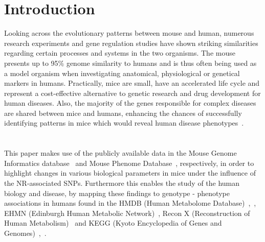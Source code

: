 \documentclass[fleqn,11pt]{SelfArx}
\affiliation{\textsuperscript{1}\textit{Institute of Bioinformatics and Systems Biology, Helmholtz Zentrum MŸnchen, German Research Center for Environmental Health,}} %
\begin{document}
\flushbottom %
\maketitle %
\thispagestyle{empty} %


\section*{Introduction} %

Looking across the evolutionary patterns between mouse and human, numerous research experiments and gene regulation studies have shown striking similarities regarding certain processes and systems in the two organisms. The mouse presents up to 95\% genome similarity to humans and is thus often being used as a model organism when investigating anatomical, physiological or genetical markers in humans. Practically, mice are small, have an accelerated life cycle and represent a cost-effective alternative to genetic research and drug development for human diseases. Also, the majority of the genes responsible for complex diseases are shared between mice and humans, enhancing the chances of successfully identifying patterns in mice which would reveal human disease phenotypes~\cite{intro1}.
~~~~~~~\\
~~~~~~~\\  
This paper makes use of the publicly available data in the Mouse Genome Informatics database~\cite{mgi} and Mouse Phenome Database~\cite{mpd}, respectively, in order to highlight changes in various biological parameters in mice under the influence of the NR-associated SNPs. Furthermore this enables the study of the human biology and disease, by mapping these findings to genotype - phenotype associations in humans found in the HMDB (Human Metabolome Database)~\cite{hm1},~\cite{hm2}, EHMN (Edinburgh Human Metabolic Network)~\cite{hm3}, Recon X (Reconstruction of Human Metabolism)~\cite{hm4} and KEGG (Kyoto Encyclopedia of Genes and Genomes)~\cite{hm5},~\cite{hm6}.
\end{document}
